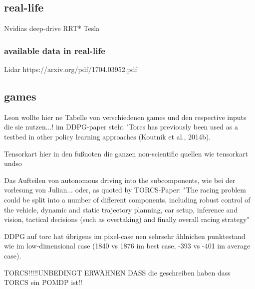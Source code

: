 \subsection{real-life}

Nvidias deep-drive
RRT*
Tesla

\subsubsection{available data in real-life}

Lidar
https://arxiv.org/pdf/1704.03952.pdf


\subsection{games}

Leon wollte hier ne Tabelle von verschiedenen games und den respective inputs die sie nutzen...!
im DDPG-paper steht "Torcs has previously been used as a testbed in other
policy learning approaches (Koutnik et al., 2014b).

\begin{table}
\end{table}

Tensorkart
hier in den fußnoten die ganzen non-scientific quellen wie tensorkart undso

Das Aufteilen von autonomous driving into the subcomponents, wie bei der vorlesung von Julian... oder, as quoted by TORCS-Paper: "The racing problem could be split into a number of different components, including robust control of the vehicle, dynamic and static trajectory planning, car setup, inference and vision, tactical decisions (such as overtaking) and finally overall racing strategy"

DDPG auf torc hat übrigens im pixel-case nen sehrsehr ählnichen punktestand wie im low-dimensional case (1840 vs 1876 im best case, -393 vs -401 im average case).


TORCS!!!!!UNBEDINGT ERWÄHNEN DASS die geschreiben haben dass TORCS ein POMDP ist!!